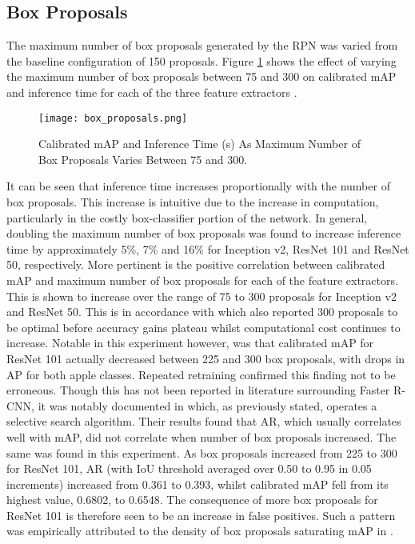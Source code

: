 \documentclass[journal]{IEEEtran}
\begin{document}
\subsection{Box Proposals} 

The maximum number of box proposals generated by the RPN was varied from the baseline configuration of 150 proposals. Figure \ref{fig:box_proposals} shows the effect of varying the maximum number of box proposals between 75 and 300 on calibrated mAP and inference time for each of the three feature extractors \cite{smallobjectdetection}.

\begin{figure}[H]
    \centering
    \texttt{[image: box\_proposals.png]}
    \caption{Calibrated mAP and Inference Time (s) As Maximum Number of Box Proposals Varies Between 75 and 300.}
    \label{fig:box_proposals}
\end{figure}

It can be seen that inference time increases proportionally with the number of box proposals. This increase is intuitive due to the increase in computation, particularly in the costly box-classifier portion of the network. In general, doubling the maximum number of box proposals was found to increase inference time by approximately 5\%, 7\% and 16\% for Inception v2, ResNet 101 and ResNet 50, respectively. More pertinent is the positive correlation between calibrated mAP and maximum number of box proposals for each of the feature extractors. This is shown to increase over the range of 75 to 300 proposals for Inception v2 and ResNet 50. This is in accordance with \cite{vgg16} which also reported 300 proposals to be optimal before accuracy gains plateau whilst computational cost continues to increase.
Notable in this experiment however, was that calibrated mAP for ResNet 101 actually decreased between 225 and 300 box proposals, with drops in AP for both apple classes. Repeated retraining confirmed this finding not to be erroneous. Though this has not been reported in literature surrounding Faster R-CNN, it was notably documented in \cite{fastrcnn} which, as previously stated, operates a selective search algorithm. Their results found that AR, which usually correlates well with mAP, did not correlate when number of box proposals increased. The same was found in this experiment. As box proposals increased from 225 to 300 for ResNet 101, AR (with IoU threshold averaged over 0.50 to 0.95 in 0.05 increments) increased from 0.361 to 0.393, whilst calibrated mAP fell from its highest value, 0.6802, to 0.6548. The consequence of more box proposals for ResNet 101 is therefore seen to be an increase in false positives. Such a pattern was empirically attributed to the density of box proposals saturating mAP in \cite{fastrcnn}. 
\end{document}
